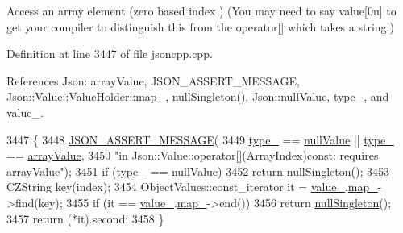 Access an array element (zero based index ) (You may need to say \textquotesingle{}value\mbox{[}0u\mbox{]}\textquotesingle{} to get your compiler to distinguish this from the operator\mbox{[}\mbox{]} which takes a string.) 

Definition at line 3447 of file jsoncpp.\+cpp.



References Json\+::array\+Value, J\+S\+O\+N\+\_\+\+A\+S\+S\+E\+R\+T\+\_\+\+M\+E\+S\+S\+A\+GE, Json\+::\+Value\+::\+Value\+Holder\+::map\+\_\+, null\+Singleton(), Json\+::null\+Value, type\+\_\+, and value\+\_\+.


\begin{DoxyCode}
3447                                                      \{
3448   \hyperlink{json_8h_ad7facdeeca0f495765e3b204c265eadb}{JSON\_ASSERT\_MESSAGE}(
3449       \hyperlink{class_json_1_1_value_abd222c2536dc88bf330dedcd076d2356}{type\_} == \hyperlink{namespace_json_a7d654b75c16a57007925868e38212b4ea7d9899633b4409bd3fc107e6737f8391}{nullValue} || \hyperlink{class_json_1_1_value_abd222c2536dc88bf330dedcd076d2356}{type\_} == \hyperlink{namespace_json_a7d654b75c16a57007925868e38212b4eadc8f264f36b55b063c78126b335415f4}{arrayValue},
3450       \textcolor{stringliteral}{"in Json::Value::operator[](ArrayIndex)const: requires arrayValue"});
3451   \textcolor{keywordflow}{if} (\hyperlink{class_json_1_1_value_abd222c2536dc88bf330dedcd076d2356}{type\_} == \hyperlink{namespace_json_a7d654b75c16a57007925868e38212b4ea7d9899633b4409bd3fc107e6737f8391}{nullValue})
3452     \textcolor{keywordflow}{return} \hyperlink{class_json_1_1_value_af2f124567acc35d021a424e53ebdfcab}{nullSingleton}();
3453   CZString key(index);
3454   ObjectValues::const\_iterator it = \hyperlink{class_json_1_1_value_aef578244546212705b9f81eb84d7e151}{value\_}.\hyperlink{union_json_1_1_value_1_1_value_holder_a1e7a5b86d4f52234f55c847ad1ce389a}{map\_}->find(key);
3455   \textcolor{keywordflow}{if} (it == \hyperlink{class_json_1_1_value_aef578244546212705b9f81eb84d7e151}{value\_}.\hyperlink{union_json_1_1_value_1_1_value_holder_a1e7a5b86d4f52234f55c847ad1ce389a}{map\_}->end())
3456     \textcolor{keywordflow}{return} \hyperlink{class_json_1_1_value_af2f124567acc35d021a424e53ebdfcab}{nullSingleton}();
3457   \textcolor{keywordflow}{return} (*it).second;
3458 \}
\end{DoxyCode}
\mbox{\label{class_json_1_1_value_a0b42557a95621a4676b46a21ffc5e949}} 
